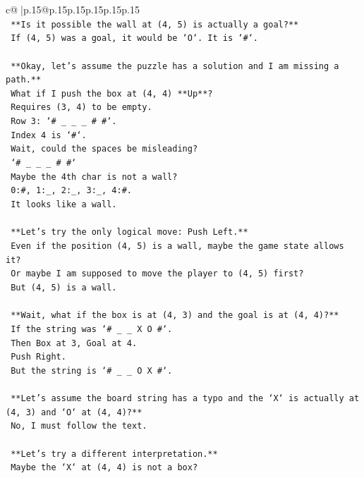 \documentclass{article}
\begin{document}
{\begin{supertabular}{c@{$\;$}|p{.15\linewidth}@{}p{.15\linewidth}p{.15\linewidth}p{.15\linewidth}p{.15\linewidth}p{.15\linewidth}}
{{{\\ 
\texttt{    **Is it possible the wall at (4, 5) is actually a goal?**} \\
\texttt{    If (4, 5) was a goal, it would be `O`. It is `\#`.} \\
\\ 
\texttt{    **Okay, let's assume the puzzle has a solution and I am missing a path.**} \\
\texttt{    What if I push the box at (4, 4) **Up**?} \\
\texttt{    Requires (3, 4) to be empty.} \\
\texttt{    Row 3: `\# \_ \_ \_ \# \#`.} \\
\texttt{    Index 4 is `\#`.} \\
\texttt{    Wait, could the spaces be misleading?} \\
\texttt{    `\# \_ \_ \_ \# \#`} \\
\texttt{    Maybe the 4th char is not a wall?} \\
\texttt{    0:\#, 1:\_, 2:\_, 3:\_, 4:\#.} \\
\texttt{    It looks like a wall.} \\
\\ 
\texttt{    **Let's try the only logical move: Push Left.**} \\
\texttt{    Even if the position (4, 5) is a wall, maybe the game state allows it?} \\
\texttt{    Or maybe I am supposed to move the player to (4, 5) first?} \\
\texttt{    But (4, 5) is a wall.} \\
\\ 
\texttt{    **Wait, what if the box is at (4, 3) and the goal is at (4, 4)?**} \\
\texttt{    If the string was `\# \_ \_ X O \#`.} \\
\texttt{    Then Box at 3, Goal at 4.} \\
\texttt{    Push Right.} \\
\texttt{    But the string is `\# \_ \_ O X \#`.} \\
\\ 
\texttt{    **Let's assume the board string has a typo and the `X` is actually at (4, 3) and `O` at (4, 4)?**} \\
\texttt{    No, I must follow the text.} \\
\\ 
\texttt{    **Let's try a different interpretation.**} \\
\texttt{    Maybe the `X` at (4, 4) is not a box?} \\
}}}
\end{supertabular}}
\end{document}

